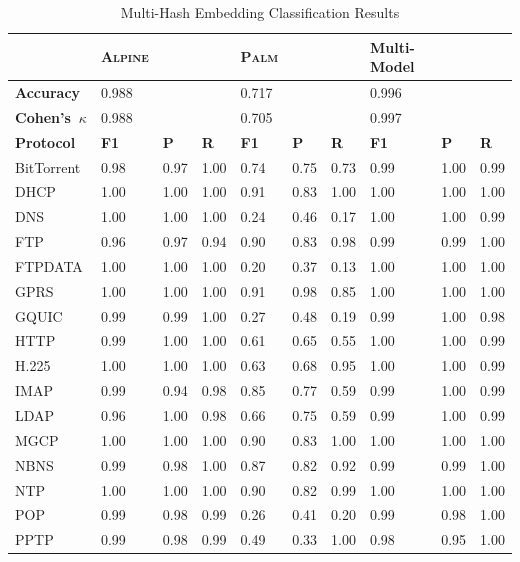 \begin{table}
\caption{Multi-Hash Embedding Classification Results}
\centering
\begin{tabular}{| p{2cm} | p{0.6cm} p{0.6cm} p{0.6cm} || p{0.6cm} p{0.6cm} p{0.6cm} || p{0.6cm} p{0.6cm} p{0.6cm}|}
\hline
& \textbf{\textsc{Alpine}} & & & \textbf{\textsc{Palm}} & & & \textbf{Multi-Model} & & \\
\hline
\hline
\textbf{Accuracy} & 0.988 & & & 0.717 & & & 0.996 & & \\
\textbf{Cohen's~$\kappa$} & 0.988 & & & 0.705 & & & 0.997 & & \\
\hline
\hline
 \textbf{Protocol} & \textbf{F1} & \textbf{P} & \textbf{R} & \textbf{F1} & \textbf{P} & \textbf{R} & \textbf{F1} & \textbf{P} & \textbf{R} \\
 \hline
 BitTorrent & 0.98 & 0.97 & 1.00 & 0.74 & 0.75 & 0.73 & 0.99 & 1.00 & 0.99 \\
 DHCP & 1.00 & 1.00 & 1.00 & 0.91 & 0.83 & 1.00 & 1.00 & 1.00 & 1.00 \\
 DNS & 1.00 & 1.00 & 1.00 & 0.24 & 0.46 & 0.17 & 1.00 & 1.00 & 0.99 \\
 FTP & 0.96 & 0.97 &  0.94 & 0.90 & 0.83 & 0.98 & 0.99 & 0.99 & 1.00 \\
 FTPDATA & 1.00 & 1.00 & 1.00 & 0.20 & 0.37 & 0.13 & 1.00 & 1.00 & 1.00 \\
 GPRS & 1.00 & 1.00 & 1.00 & 0.91 & 0.98 & 0.85 & 1.00 & 1.00 & 1.00 \\
 GQUIC & 0.99 & 0.99 & 1.00 & 0.27 & 0.48 & 0.19 & 0.99 & 1.00 & 0.98 \\
 HTTP & 0.99 & 1.00 & 1.00 & 0.61 & 0.65 & 0.55 & 1.00 & 1.00 & 0.99 \\
 H.225 & 1.00 & 1.00 & 1.00 & 0.63 & 0.68 & 0.95 & 1.00 & 1.00 & 0.99 \\
 IMAP & 0.99 & 0.94 & 0.98 & 0.85 & 0.77 & 0.59 & 0.99 & 1.00 & 0.99 \\
 LDAP & 0.96 & 1.00 & 0.98 & 0.66 & 0.75 & 0.59 & 0.99 & 1.00 & 0.99 \\
 MGCP & 1.00 & 1.00 & 1.00 & 0.90 & 0.83 & 1.00 & 1.00 & 1.00 & 1.00 \\
 NBNS & 0.99 & 0.98 & 1.00 & 0.87 & 0.82 & 0.92 & 0.99 & 0.99 & 1.00 \\
 NTP & 1.00 & 1.00 & 1.00 & 0.90 & 0.82 & 0.99 & 1.00 & 1.00 & 1.00 \\
 POP & 0.99 & 0.98 & 0.99 & 0.26 & 0.41 & 0.20 & 0.99 & 0.98 & 1.00 \\
 PPTP & 0.99 & 0.98 & 0.99 & 0.49 & 0.33 & 1.00 & 0.98 & 0.95 & 1.00 \\

\end{tabular}
\end{table}
